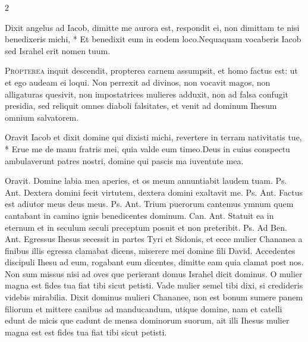 \begin{multicols*}{2}
\begin{responsory}
{Dixit angelus ad Iacob, dimitte me aurora est, respondit ei, non dimittam te nisi benedixeris michi, * Et benedixit eum in eodem loco.}{Nequaquam vocaberis Iacob sed Israhel erit nomen tuum.}
\end{responsory}%
\lettrine[lines=2]{\zallmancaps \color{Blue} P}{ropterea} inquit descendit, propterea carnem assumpsit, et homo factus est: ut et ego audeam ei loqui. Non perrexit ad divinos, non vocavit magos, non alligaturas quesivit, non impostatrices mulieres adduxit, non ad falsa confugit presidia, sed reliquit omnes diaboli falsitates, et venit ad dominum Ihesum omnium salvatorem.
\begin{responsory-doxology}
{Oravit Iacob et dixit domine qui dixisti michi, revertere in terram nativitatis tue, * Erue me de manu fratris mei, quia valde eum timeo.}{Deus in cuius conspectu ambulaverunt patres nostri, domine qui pascis ma iuventute mea.}
\end{responsory-doxology}%
{\color{Red} Oravit.}
 Domine labia mea aperies, et os meum annuntiabit laudem tuam. {\color{Red} Ps.}  {\color{Red} Ant.} Dextera domini fecit virtutem, dextera domini exaltavit me. {\color{Red} Ps.}  {\color{Red} Ant.} Factus est adiutor meus deus meus. {\color{Red} Ps.}  {\color{Red} Ant.} Trium puerorum cantemus ymnum quem cantabant in camino ignis benedicentes
dominum. {\color{Red} Can.}  {\color{Red} Ant.} Statuit ea in eternum et in seculum seculi preceptum posuit et non preteribit. {\color{Red} Ps.}  {\color{Red} Ad Ben. Ant.} Egressus Ihesus secessit in partes Tyri et Sidonis, et ecce mulier Chananea a finibus illis egressa clamabat dicens, miserere mei domine fili David.
 Accedentes discipuli Ihesu ad eum, rogabant eum dicentes, dimitte eam quia clamat post nos.
 Non sum missus nisi ad oves que perierant domus Israhel dicit dominus.
 O mulier magna est fides tua fiat tibi sicut petisti.
 Vade mulier semel tibi dixi, si credideris videbis mirabilia.
 Dixit dominus mulieri Chananee, non est bonum sumere panem filiorum et mittere canibus ad manducandum, utique domine, nam et catelli edunt de micis que cadunt de mensa dominorum suorum, ait illi Ihesus mulier magna est est fides tua fiat tibi sicut petisti.

\end{multicols*}
